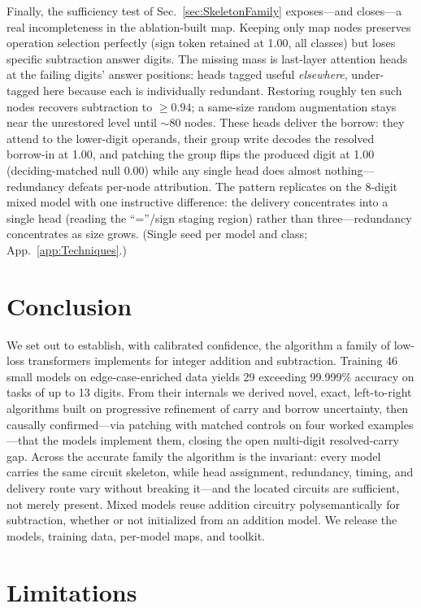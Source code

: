 \documentclass[11pt]{article}
\begin{document}
Finally, the sufficiency test of Sec.~\ref{sec:SkeletonFamily} exposes---and closes---a real incompleteness in the ablation-built map. Keeping only map nodes preserves operation selection perfectly (sign token retained at 1.00, all classes) but loses specific subtraction answer digits. The missing mass is last-layer attention heads at the failing digits' answer positions: heads tagged useful \emph{elsewhere}, under-tagged here because each is individually redundant. Restoring roughly ten such nodes recovers subtraction to ${\geq}0.94$; a same-size random augmentation stays near the unrestored level until ${\sim}80$ nodes. These heads deliver the borrow: they attend to the lower-digit operands, their group write decodes the resolved borrow-in at 1.00, and patching the group flips the produced digit at 1.00 (deciding-matched null 0.00) while any single head does almost nothing---redundancy defeats per-node attribution. The pattern replicates on the 8-digit mixed model with one instructive difference: the delivery concentrates into a single head (reading the ``=''/sign staging region) rather than three---redundancy concentrates as size grows. (Single seed per model and class; App.~\ref{app:Techniques}.)

\section{Conclusion}
\label{sec:Conclusion}
We set out to establish, with calibrated confidence, the algorithm a family of low-loss transformers implements for integer addition and subtraction. 
Training 46 small models on edge-case-enriched data yields 29 exceeding 99.999\% accuracy on tasks of up to 13 digits. From their internals we derived novel, 
exact, left-to-right algorithms built on progressive refinement of carry and borrow uncertainty, then causally confirmed---via patching with matched controls 
on four worked examples---that the models implement them, closing the open multi-digit resolved-carry gap. Across the accurate family the algorithm is the invariant: 
every model carries the same circuit skeleton, while head assignment, redundancy, timing, and delivery route vary without breaking it---and the located circuits are 
sufficient, not merely present. Mixed models reuse addition circuitry polysemantically for subtraction, whether or not initialized from an addition model. 
We release the models, training data, per-model maps, and toolkit.

\section*{Limitations}
\label{sec:LimitationsAndFutureWork}
\end{document}
